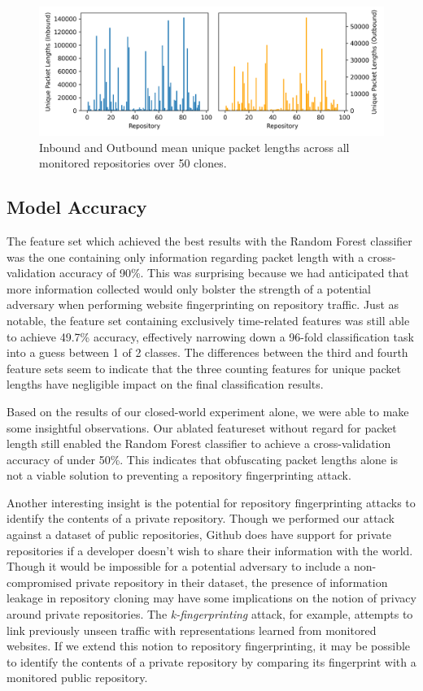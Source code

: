 \documentclass[sigconf,authorversion,nonacm]{acmart}
\begin{document}
\begin{figure}
  \includegraphics[width=\textwidth]{charts/unique-packet-lengths.png}
  \caption{Inbound and Outbound mean unique packet lengths across all monitored repositories over 50 clones.}
  \label{fig:uniquepacket}
\end{figure}

\subsection{Model Accuracy}
The feature set which achieved the best results with the Random Forest classifier was the one containing only information regarding packet length with a cross-validation accuracy of 90\%.  This was surprising because we had anticipated that more information collected would only bolster the strength of a potential adversary when performing website fingerprinting on repository traffic. Just as notable, the feature set containing exclusively time-related features was still able to achieve 49.7\% accuracy, effectively narrowing down a 96-fold classification task into a guess between 1 of 2 classes. The differences between the third and fourth feature sets seem to indicate that the three counting features for unique packet lengths have negligible impact on the final classification results.

Based on the results of our closed-world experiment alone, we were able to make some insightful observations. Our ablated featureset without regard for packet length still enabled the Random Forest classifier to achieve a cross-validation accuracy of under 50\%. This indicates that obfuscating packet lengths alone is not a viable solution to preventing a repository fingerprinting attack.

Another interesting insight is the potential for repository fingerprinting attacks to identify the contents of a private repository. Though we performed our attack against a dataset of public repositories, Github does have support for private repositories if a developer doesn't wish to share their information with the world. Though it would be impossible for a potential adversary to include a non-compromised private repository in their dataset, the presence of information leakage in repository cloning may have some implications on the notion of privacy around private repositories. The \textit{k-fingerprinting} attack, for example, attempts to link previously unseen traffic with representations learned from monitored websites. If we extend this notion to repository fingerprinting, it may be possible to identify the contents of a private repository by comparing its fingerprint with a monitored public repository.
\end{document}
